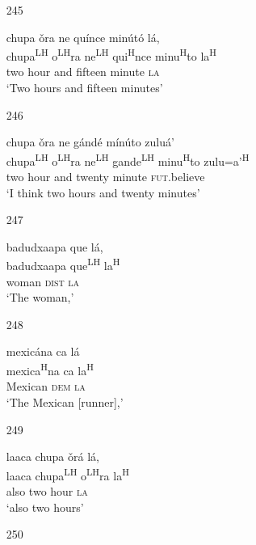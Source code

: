 \begin{itemize}
\item[245]
 
\glll   chupa \v{o}ra ne qu\'{i}nce min\'{u}t\'{o} l\'{a}, \\
 chupa\textsuperscript{LH} o\textsuperscript{LH}ra ne\textsuperscript{LH} qui\textsuperscript{H}nce minu\textsuperscript{H}to la\textsuperscript{H} \\
 two hour and fifteen minute \textsc{la} \\
\glt `Two hours and fifteen minutes'
 


\item[246]
 
\glll   chupa \v{o}ra ne g\'{a}nd\'{e} m\'{i}n\'{u}to zulu\'{a}' \\
chupa\textsuperscript{LH} o\textsuperscript{LH}ra ne\textsuperscript{LH} gande\textsuperscript{LH} minu\textsuperscript{H}to zulu=a'\textsuperscript{H} \\
 two hour and twenty minute \textsc{fut}.believe \\
\glt `I think two hours and twenty minutes'
 


\item[247]
 
\glll   badudxaapa que l\'{a}, \\
badudxaapa que\textsuperscript{LH} la\textsuperscript{H} \\
woman \textsc{dist} \textsc{la} \\
\glt `The woman,'
 


\item[248]
 
\glll   mexic\'{a}na ca l\'{a} \\
mexica\textsuperscript{H}na ca la\textsuperscript{H}  \\
Mexican \textsc{dem} \textsc{la} \\
\glt `The Mexican [runner],' 
 


\item[249]
 
\glll   laaca chupa \v{o}r\'{a} l\'{a}, \\
 laaca chupa\textsuperscript{LH} o\textsuperscript{LH}ra la\textsuperscript{H} \\
 also two hour \textsc{la} \\
\glt `also two hours'
 


\item[250]
 

\end{itemize}
